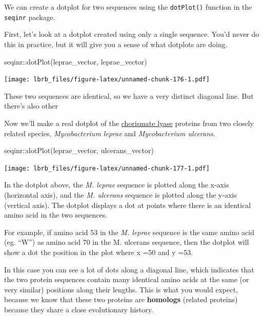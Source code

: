 \documentclass[
]{book}
\newenvironment{Shaded}{\begin{snugshade}}{\end{snugshade}}
\newcommand{\FunctionTok}[1]{\textcolor[rgb]{0.00,0.00,0.00}{#1}}
\newcommand{\NormalTok}[1]{#1}
\newcommand{\SpecialCharTok}[1]{\textcolor[rgb]{0.00,0.00,0.00}{#1}}
\begin{document}
We can create a dotplot for two sequences using the \texttt{dotPlot()} function in the \texttt{seqinr} package.

First, let's look at a dotplot created using only a single sequence. You'd never do this in practice, but it will give you a sense of what dotplots are doing.

\begin{Shaded}
\begin{Highlighting}[]
\NormalTok{seqinr}\SpecialCharTok{::}\FunctionTok{dotPlot}\NormalTok{(leprae\_vector, }
\NormalTok{                leprae\_vector)}
\end{Highlighting}
\end{Shaded}

\texttt{[image: lbrb\_files/figure-latex/unnamed-chunk-176-1.pdf]}

These two sequences are identical, so we have a very distinct diagonal line. But there's also other

Now we'll make a real dotplot of the \href{https://en.wikipedia.org/wiki/Chorismate_lyase}{chorismate lyase} proteins from two closely related species, \emph{Mycobacterium leprae} and \emph{Mycobacterium ulcerans}.

\begin{Shaded}
\begin{Highlighting}[]
\NormalTok{seqinr}\SpecialCharTok{::}\FunctionTok{dotPlot}\NormalTok{(leprae\_vector, }
\NormalTok{                ulcerans\_vector)}
\end{Highlighting}
\end{Shaded}

\texttt{[image: lbrb\_files/figure-latex/unnamed-chunk-177-1.pdf]}

In the dotplot above, the \emph{M. leprae} sequence is plotted along the x-axis (horizontal axis), and the \emph{M. ulcerans} sequence is plotted along the y-axis (vertical axis). The dotplot displays a dot at points where there is an identical amino acid in the two sequences.

For example, if amino acid 53 in the \emph{M. leprae} sequence is the same amino acid (eg. ``W'') as amino acid 70 in the M. ulcerans sequence, then the dotplot will show a dot the position in the plot where x =50 and y =53.

In this case you can see a lot of dots along a diagonal line, which indicates that the two protein sequences contain many identical amino acids at the same (or very similar) positions along their lengths. This is what you would expect, because we know that these two proteins are \textbf{homologs} (related proteins) because they share a close evolutionary history.
\end{document}
